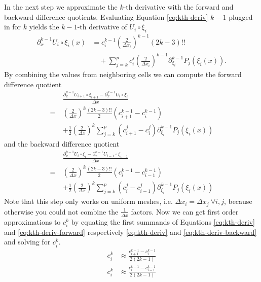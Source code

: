 In the next step we approximate the $k$-th derivative with the forward and backward difference quotients.
Evaluating Equation \eqref{eq:kth-deriv} $k - 1$ plugged in for $k$ yields the $k - 1$-th derivative of $U_{i} \circ \xi_{i}$
\begin{align*}
  \partial_{x}^{k - 1} U_{i} \circ \xi_{i}(x) & = c_{i}^{k - 1} \left( \frac{2}{\Delta x_{i}} \right)^{k - 1} \left( 2k - 3 \right)!!\\
  & \quad + \sum_{j = k}^{p} c_{i}^{j} \left( \frac{2}{\Delta x_{i}} \right)^{k - 1} \partial_{\xi_{i}}^{k - 1} P_{j}(\xi_{i}(x)).
\end{align*}
By combining the values from neighboring cells we can compute the forward difference quotient
\begin{align}
  & \frac{\partial_{x}^{k - 1} U_{i + 1} \circ \xi_{i + 1} - \partial_{x}^{k - 1} U_{i} \circ \xi_{i}}{\Delta x}\nonumber\\
  =~& \left( \frac{2}{\Delta x} \right)^{k} \frac{(2k - 3)!!}{2} (c_{i + 1}^{k - 1} - c_{i}^{k - 1})\nonumber\\
  & + \frac{1}{2} \left( \frac{2}{\Delta x} \right)^{k} \sum_{j = k}^{p} (c_{i + 1}^{j} - c_{i}^{j}) \partial_{\xi_{i}}^{k - 1} P_{j}(\xi_{i}(x)) \label{eq:kth-deriv-forward}
\end{align}
and the backward difference quotient
\begin{align}
  & \frac{\partial_{x}^{k - 1} U_{i} \circ \xi_{i} - \partial_{x}^{k - 1} U_{i - 1} \circ \xi_{i - 1}}{\Delta x}\nonumber\\
  =~& \left( \frac{2}{\Delta x} \right)^{k} \frac{(2k - 3)!!}{2} (c_{i}^{k - 1} - c_{i - 1}^{k - 1})\nonumber\\
  & + \frac{1}{2} \left( \frac{2}{\Delta x} \right)^{k} \sum_{j = k}^{p} (c_{i}^{j} - c_{i - 1}^{j}) \partial_{\xi_{i}}^{k - 1} P_{j}(\xi_{i}(x)) \label{eq:kth-deriv-backward}
\end{align}
Note that this step only works on uniform meshes, i.e. $\Delta x_{i} = \Delta x_{j}~\forall i, j$, because otherwise you could not combine the $\frac{1}{\Delta x}$ factors.
Now we can get first order approximations to $c_{i}^{k}$ by equating the first summands of Equations \eqref{eq:kth-deriv} and \eqref{eq:kth-deriv-forward} respectively \eqref{eq:kth-deriv} and \eqref{eq:kth-deriv-backward} and solving for $c_{i}^{k}$.
\begin{align*}
  c_{i}^{k} & \approx \frac{c_{i + 1}^{k - 1} - c_{i}^{k - 1}}{2(2k - 1)}\\
  c_{i}^{k} & \approx \frac{c_{i}^{k - 1} - c_{i - 1}^{k - 1}}{2(2k - 1)}
\end{align*}
